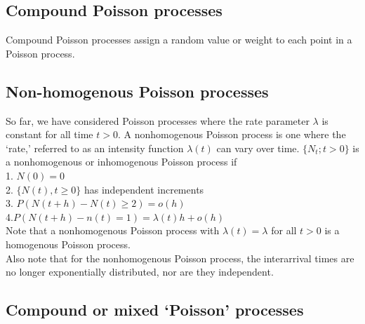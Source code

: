 \documentclass[12pt]{report}
\begin{document}
\subsection{Compound Poisson processes}
Compound Poisson processes assign a random value or weight to each point in a Poisson process.

\subsection{Non-homogenous Poisson processes}
So far, we have considered Poisson processes where the rate parameter $\lambda$ is constant for all time $t > 0$. A nonhomogenous Poisson process is one where the `rate,' referred to as an intensity function $\lambda(t)$ can vary over time. $\{N_t; t>0\}$ is a nonhomogenous or inhomogenous Poisson process if\\
1. $N(0) = 0$\\
2. $\{N(t), t\ge 0 \}$ has independent increments\\
3. $P(N(t+h) - N(t) \ge 2) = o(h)$\\
4.$ P(N(t+h) - n(t) = 1) = \lambda(t)h + o(h)$\\
Note that a nonhomogenous Poisson process with $\lambda(t) = \lambda$ for all $t>0$ is a homogenous Poisson process.\\
Also note that for the nonhomogenous Poisson process, the interarrival times are no longer exponentially distributed, nor are they independent. 
\subsection{Compound or mixed `Poisson' processes}
\end{document}
